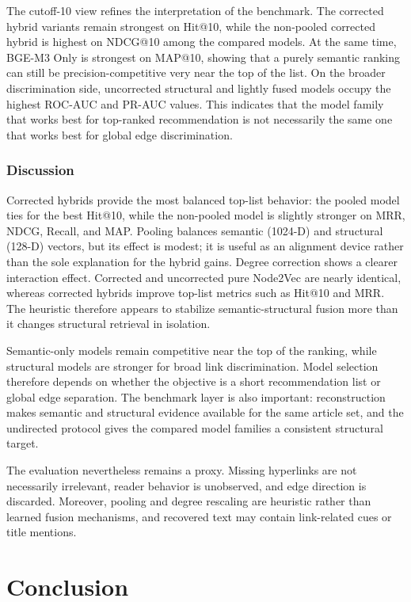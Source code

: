 \documentclass[runningheads]{llncs}
\begin{document}
The cutoff-10 view refines the interpretation of the benchmark. The corrected
hybrid variants remain strongest on Hit@10, while the non-pooled corrected
hybrid is highest on NDCG@10 among the compared models. At the same time,
BGE-M3 Only is strongest on MAP@10, showing that a purely semantic ranking can
still be precision-competitive very near the top of the list. On the broader
discrimination side, uncorrected structural and lightly fused models occupy the
highest ROC-AUC and PR-AUC values. This indicates that the model family that
works best for top-ranked recommendation is not necessarily the same one that
works best for global edge discrimination.

\subsubsection{Discussion}

Corrected hybrids provide the most balanced top-list behavior: the pooled model
ties for the best Hit@10, while the non-pooled model is slightly stronger on
MRR, NDCG, Recall, and MAP. Pooling balances semantic (1024-D) and structural
(128-D) vectors, but its effect is modest; it is useful as an alignment device
rather than the sole explanation for the hybrid gains. Degree correction shows
a clearer interaction effect. Corrected and uncorrected pure Node2Vec are nearly
identical, whereas corrected hybrids improve top-list metrics such as Hit@10 and
MRR. The heuristic therefore appears to stabilize semantic-structural fusion
more than it changes structural retrieval in isolation.

Semantic-only models remain competitive near the top of the ranking, while
structural models are stronger for broad link discrimination. Model selection
therefore depends on whether the objective is a short recommendation list or
global edge separation. The benchmark layer is also important: reconstruction
makes semantic and structural evidence available for the same article set, and
the undirected protocol gives the compared model families a consistent
structural target.

The evaluation nevertheless remains a proxy. Missing hyperlinks are not
necessarily irrelevant, reader behavior is unobserved, and edge direction is
discarded. Moreover, pooling and degree rescaling are heuristic rather than
learned fusion mechanisms, and recovered text may contain link-related cues or
title mentions.

\section{Conclusion}
\end{document}
